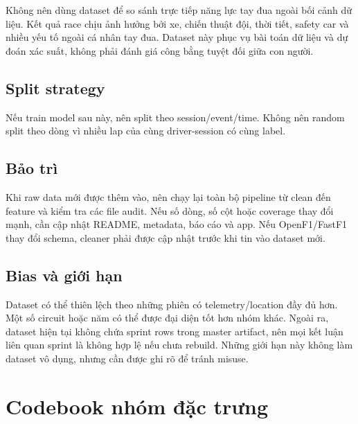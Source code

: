 \documentclass[conference]{IEEEtran}
\begin{document}
Không nên dùng dataset để so sánh trực tiếp năng lực tay đua ngoài bối cảnh dữ liệu. Kết quả race chịu ảnh hưởng bởi xe, chiến thuật đội, thời tiết, safety car và nhiều yếu tố ngoài cá nhân tay đua. Dataset này phục vụ bài toán dữ liệu và dự đoán xác suất, không phải đánh giá công bằng tuyệt đối giữa con người.

\subsection{Split strategy}
Nếu train model sau này, nên split theo session/event/time. Không nên random split theo dòng vì nhiều lap của cùng driver-session có cùng label.

\subsection{Bảo trì}
Khi raw data mới được thêm vào, nên chạy lại toàn bộ pipeline từ clean đến feature và kiểm tra các file audit. Nếu số dòng, số cột hoặc coverage thay đổi mạnh, cần cập nhật README, metadata, báo cáo và app. Nếu OpenF1/FastF1 thay đổi schema, cleaner phải được cập nhật trước khi tin vào dataset mới.

\subsection{Bias và giới hạn}
Dataset có thể thiên lệch theo những phiên có telemetry/location đầy đủ hơn. Một số circuit hoặc năm có thể được đại diện tốt hơn nhóm khác. Ngoài ra, dataset hiện tại không chứa sprint rows trong master artifact, nên mọi kết luận liên quan sprint là không hợp lệ nếu chưa rebuild. Những giới hạn này không làm dataset vô dụng, nhưng cần được ghi rõ để tránh misuse.

\section{Codebook nhóm đặc trưng}
\end{document}
